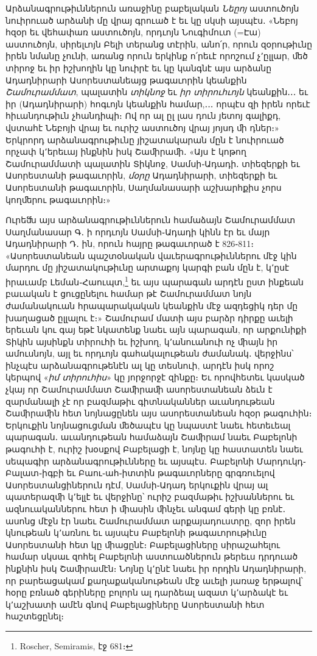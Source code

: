 \documentclass{article}
\begin{document}
{Արձանագրութիւններուն առաջինը բաբելական \emph{Նեըոյ} աստուծոյն նուիրուած արձանի մը վրայ գրուած է եւ կը սկսի այսպէս․ «Նեբոյ հզօր եւ վեհափառ աստուծոյն, որդւոյն Նուգիմուտ (=Էա) աստուծոյն, սիրելւոյն Բելի տերանց տէրին, անո՛ր, որուն զօրութիւնը իրեն նմանը չունի, առանց որուն երկինք ո՛րեւէ որոշում չ՚ըլլար, ﬔծ տիրոջ եւ իր իշխողին կը նուիրէ եւ կը կանգնէ այս արձանը Ադադնիրարի Ասորեստանեայց թագաւորին կեանքին \emph{Շամուրամմատ}, պալատին \emph{տիկնոջ} եւ \emph{իր տիրուհւոյն} կեանքին․․․ եւ իր (Ադադնիրարի) հոգւոյն կեանքին համար,․․․ որպէս զի իրեն որեւէ հիւանդութիւն չհանդիպի։ Ով որ ալ ըլ լաս դուն յետոյ գալիքդ, վստահէ Նեբոյի վրայ եւ ուրիշ աստուծոյ վրայ յոյսդ ﬕ դներ։» Երկրորդ արձանագրութիւնը յիշատակարան մըն է նուիրուած որչափ կ՚երեւայ ինքնին իսկ Շաﬕրաﬕ․ «Այս է կոթող Շամուրամմատի պալատին Տիկնոջ, Սամսի֊Ադադի․ տիեզերքի եւ Ասորեստանի թագաւորին, \emph{մօրը} Ադադնիրարի, տիեզերքի եւ Ասորեստանի թագաւորին, Սաղմանասարի աշխարհքիս չորս կողﬔրու թագաւորին։»

Ուրեﬓ այս արձանագրութիւններուն համաձայն Շամուրամմատ Սաղմանասար Գ․ ի որդւոյն Սամսի֊Ադադի կինն էր եւ մայր Ադադնիրարի Դ․ ին, որուն հայրը թագաւորած է 826֊811։ «Ասորեստանեան պաշտօնական վաւերագրութիւններու մէջ կին մարդու մը յիշատակութիւնը արտաքոյ կարգի բան մըն է, կ՚ըսէ իրաւամբ Լեման֊Հաուպտ,\footnote{Roscher, Semiramis, էջ 681։} եւ այս պարագան արդէն ըստ ինքեան բաւական է ցուցընելու համար թէ Շամուրամմատ նոյն ժամանակուան հրապարակական կեանքին մէջ ազդեցիկ դեր մը խաղացած ըլլալու է։» Շամուրամ մատի այս բարձր դիրքը աւելի երեւան կու գայ եթէ նկատենք նաեւ այն պարագան, որ արքունիքի Տիկին այսինքն տիրուհի եւ իշխող, կ՚անուանուի ոչ ﬕայն իր ամուսնոյն, այլ եւ որդւոյն գահակալութեան ժամանակ․ վերջինս՝ ինչպէս արձանագրութենէն ալ կը տեսնուի, արդէն իսկ որոշ կերպով «\emph{իմ տիրուհիս}» կը յորջորջէ զինքը։ Եւ որովհետեւ կասկած չկայ որ Շամուրամմատ Շաﬕրաﬕ ասորեստանեան ձեւն է զարմանալի չէ որ բազմաթիւ գիտնականներ աւանդութեան Շաﬕրաﬕն հետ նոյնացընեն այս ասորեստանեան հզօր թագուհին։ Երկուքին նոյնացուցման ﬔծապէս կը նպաստէ նաեւ հետեւեալ պարագան․ աւանդութեան համաձայն Շաﬕրամ նաեւ Բաբելոնի թագուհի է, ուրիշ խօսքով Բաբելացի է, նոյնը կը հաստատեն նաեւ սեպագիր արձանագրութիւնները եւ այսպէս․ Բաբելոնի Մարդուկդ֊Բալատ֊իգբի եւ Բաու֊ահ֊իտտին թագաւորները գրգռուելով Ասորեստանցիներուն դէմ, Սամսի֊Ադադ երկուքին վրայ ալ պատերազﬕ կ՚ելլէ եւ վերջինը՝ ուրիշ բազմաթիւ իշխաններու եւ ազնուականներու հետ ի ﬕասին ﬕնչեւ անգամ գերի կը բռնէ․ ասոնց մէջն էր նաեւ Շամուրամմատ արքայադուստրը, զոր իրեն կնութեան կ՚առնու եւ այսպէս Բաբելոնի թագաւորութիւնը Ասորեստանի հետ կը ﬕացընէ։ Բաբելացիները սիրաշահելու համար սկսաւ զոհել Բաբելոնի աստուածներուն թերեւս դրդուած ինքնին իսկ Շաﬕրամէն։ Նոյնը կ՚ընէ նաեւ իր որդին Ադադնիրարի, որ բարեացակամ քաղաքականութեան մէջ աւելի յառաջ երթալով՝ հօրը բռնած գերիները բոլորն ալ դարձեալ ազատ կ՚արձակէ եւ կ՚աշխատի ամէն գնով Բաբելացիները Ասորեստանի հետ հաշտեցընել։

}
\end{document}
